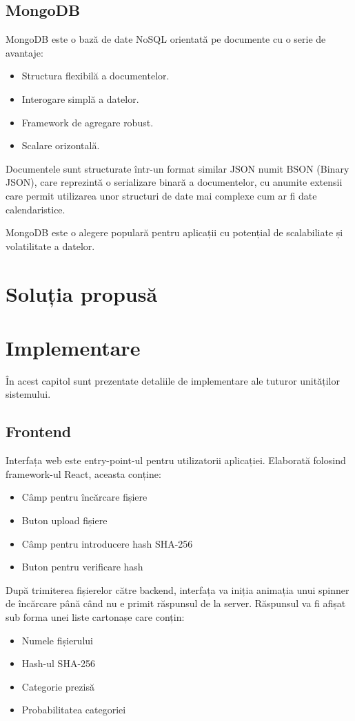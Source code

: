 \documentclass[12pt,a4paper]{report}
\begin{document}
\section{MongoDB}
MongoDB\cite{mongodb} este o bază de date NoSQL orientată pe documente cu o serie de avantaje:
\begin{itemize}
      \item Structura flexibilă a documentelor.
      \item Interogare simplă a datelor.
      \item Framework de agregare robust.
      \item Scalare orizontală.
\end{itemize}

Documentele sunt structurate într-un format similar JSON numit BSON (Binary JSON),
care reprezintă o serializare binară a documentelor, cu anumite extensii care permit utilizarea unor structuri de date mai complexe
cum ar fi date calendaristice.

MongoDB este o alegere populară pentru aplicații cu potențial de scalabiliate și volatilitate a datelor.


\chapter{Soluția propusă}


\chapter{Implementare}
În acest capitol sunt prezentate detaliile de implementare ale tuturor unităților sistemului.

\section{Frontend}
Interfața web este entry-point-ul pentru utilizatorii aplicației.
Elaborată folosind framework-ul React\cite{react}, aceasta conține:
\begin{itemize}
      \item Câmp pentru încărcare fișiere
      \item Buton upload fișiere
      \item Câmp pentru introducere hash SHA-256
      \item Buton pentru verificare hash
\end{itemize}
După trimiterea fișierelor către backend, interfața va iniția animația unui spinner de încărcare
până când nu e primit răspunsul de la server.
Răspunsul va fi afișat sub forma unei liste cartonașe care conțin:
\begin{itemize}
      \item Numele fișierului
      \item Hash-ul SHA-256
      \item Categorie prezisă
      \item Probabilitatea categoriei
\end{itemize}
\end{document}
